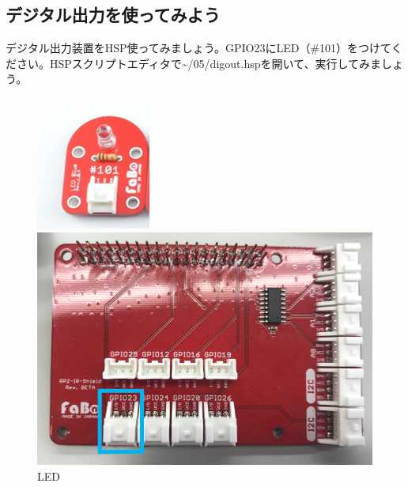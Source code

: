 \subsection{デジタル出力を使ってみよう}
デジタル出力装置をHSP使ってみましょう。GPIO23にLED（\#101）をつけてください。HSPスクリプトエディタで\textasciitilde /05/digout.hspを開いて、実行してみましょう。\\
\begin{figure}[H]
  \begin{minipage}[t]{0.3\columnwidth}
    \centering
 \includegraphics[width=\linewidth]{images/chap05/text05-img026.png}
    \caption{LED}
  \end{minipage}
  \begin{minipage}[t]{0.5\columnwidth}
    \centering
    \includegraphics[width=\linewidth]{images/chap05/text05-img027.png}

\end{minipage}
\end{figure}
